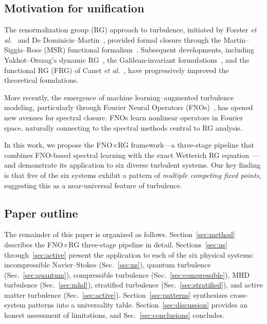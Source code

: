 \subsection{Motivation for unification}

The renormalization group (RG) approach to turbulence, initiated by Forster \textit{et al.}~\cite{forster1977large} and De Dominicis--Martin~\cite{de1979energy}, provided formal closure through the Martin--Siggia--Rose (MSR) functional formalism~\cite{martin1973statistical}. Subsequent developments, including Yakhot--Orszag's dynamic RG~\cite{yakhot1986renormalization}, the Galilean-invariant formulations~\cite{adhzhemyan1996renormalization}, and the functional RG (FRG) of Canet \textit{et al.}~\cite{canet2005nonperturbative}, have progressively improved the theoretical foundations.

More recently, the emergence of machine learning--augmented turbulence modeling, particularly through Fourier Neural Operators (FNOs)~\cite{li2021fourier}, has opened new avenues for spectral closure. FNOs learn nonlinear operators in Fourier space, naturally connecting to the spectral methods central to RG analysis.

In this work, we propose the FNO$\times$RG framework---a three-stage pipeline that combines FNO-based spectral learning with the exact Wetterich RG equation~\cite{wetterich1993exact}---and demonstrate its application to six diverse turbulent systems. Our key finding is that five of the six systems exhibit a pattern of \emph{multiple competing fixed points}, suggesting this as a near-universal feature of turbulence.

\subsection{Paper outline}

The remainder of this paper is organized as follows. Section~\ref{sec:method} describes the FNO$\times$RG three-stage pipeline in detail. Sections~\ref{sec:ns} through~\ref{sec:active} present the application to each of the six physical systems: incompressible Navier--Stokes (Sec.~\ref{sec:ns}), quantum turbulence (Sec.~\ref{sec:quantum}), compressible turbulence (Sec.~\ref{sec:compressible}), MHD turbulence (Sec.~\ref{sec:mhd}), stratified turbulence (Sec.~\ref{sec:stratified}), and active matter turbulence (Sec.~\ref{sec:active}). Section~\ref{sec:patterns} synthesizes cross-system patterns into a universality table. Section~\ref{sec:discussion} provides an honest assessment of limitations, and Sec.~\ref{sec:conclusions} concludes.

